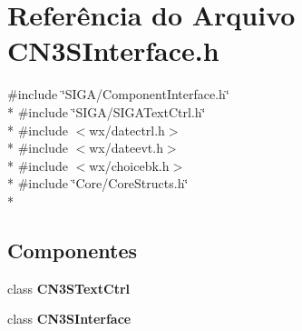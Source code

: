 \section{Referência do Arquivo C\+N3\+S\+Interface.\+h}
\label{_c_n3_s_interface_8h}
{\ttfamily \#include \char`\"{}S\+I\+G\+A/\+Component\+Interface.\+h\char`\"{}}\\*
{\ttfamily \#include \char`\"{}S\+I\+G\+A/\+S\+I\+G\+A\+Text\+Ctrl.\+h\char`\"{}}\\*
{\ttfamily \#include $<$wx/datectrl.\+h$>$}\\*
{\ttfamily \#include $<$wx/dateevt.\+h$>$}\\*
{\ttfamily \#include $<$wx/choicebk.\+h$>$}\\*
{\ttfamily \#include \char`\"{}Core/\+Core\+Structs.\+h\char`\"{}}\\*
\subsection*{Componentes}
\begin{DoxyCompactItemize}
\item 
class {\bf C\+N3\+S\+Text\+Ctrl}
\item 
class {\bf C\+N3\+S\+Interface}
\end{DoxyCompactItemize}

